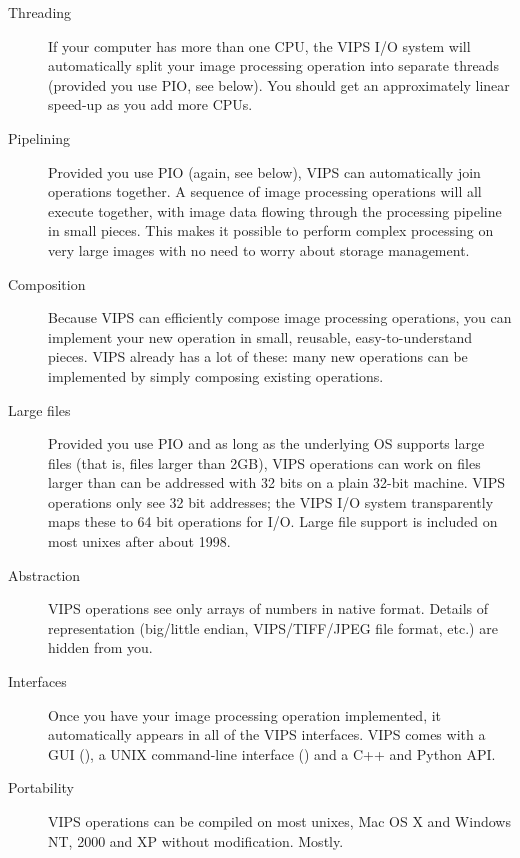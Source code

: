 \begin{description}

\item[Threading]
If your computer has more than one CPU, the VIPS I/O system will automatically
split your image processing operation into separate threads (provided you
use PIO, see below). You should get an approximately linear speed-up as
you add more CPUs.

\item[Pipelining]
Provided you use PIO (again, see below), VIPS can automatically join
operations together. A sequence of image processing operations will all
execute together, with image data flowing through the processing pipeline
in small pieces. This makes it possible to perform complex processing on
very large images with no need to worry about storage management.

\item[Composition]
Because VIPS can efficiently compose image processing operations, you can
implement your new operation in small, reusable, easy-to-understand
pieces. VIPS already has a lot of these: many new operations can be
implemented by simply composing existing operations.

\item[Large files]
Provided you use PIO and as long as the underlying OS supports large files
(that is, files larger than 2GB), VIPS operations can work on files larger
than can be addressed with 32 bits on a plain 32-bit machine. VIPS operations
only see 32 bit addresses; the VIPS I/O system transparently maps these to
64 bit operations for I/O. Large file support is included on most unixes after
about 1998.

\item[Abstraction]
VIPS operations see only arrays of numbers in native format. Details of
representation (big/little endian, VIPS/TIFF/JPEG file format, etc.) are 
hidden from you.

\item[Interfaces]
Once you have your image processing operation implemented, it automatically
appears in all of the VIPS interfaces. VIPS comes with a GUI (\nip{}), a
UNIX command-line interface (\vips{}) and a C++ and Python API.

\item[Portability]
VIPS operations can be compiled on most unixes, Mac OS X and Windows NT, 2000
and XP without modification. Mostly.

\end{description}

